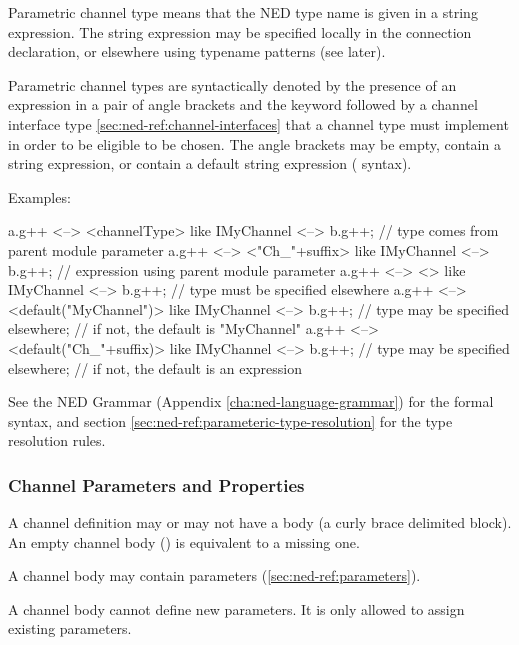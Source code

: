 Parametric channel type means that the NED type name is given in a string
expression. The string expression may be specified locally in the connection
declaration, or elsewhere using typename patterns (see later).

Parametric channel types are syntactically denoted by the presence of an
expression in a pair of angle brackets and the  keyword
followed by a channel interface type \ref{sec:ned-ref:channel-interfaces}
that a channel type must implement in order to be eligible to be chosen.
The angle brackets may be empty, contain a string expression, or contain a
default string expression ( syntax).

Examples:

\begin{ned}
a.g++ <--> <channelType> like IMyChannel <--> b.g++;
                                  // type comes from parent module parameter
a.g++ <--> <"Ch_"+suffix> like IMyChannel <--> b.g++;
                                  // expression using parent module parameter
a.g++ <--> <> like IMyChannel <--> b.g++;
                                  // type must be specified elsewhere
a.g++ <--> <default("MyChannel")> like IMyChannel <--> b.g++;
                                  // type may be specified elsewhere;
                                  // if not, the default is "MyChannel"
a.g++ <--> <default("Ch_"+suffix)> like IMyChannel <--> b.g++;
                                  // type may be specified elsewhere;
                                  // if not, the default is an expression
\end{ned}

See the NED Grammar (Appendix \ref{cha:ned-language-grammar}) for the
formal syntax, and section \ref{sec:ned-ref:parameteric-type-resolution}
for the type resolution rules.


\subsubsection{Channel Parameters and Properties}
\label{sec:ned-ref:channel-parameters-and-properties}

A channel definition may or may not have a body (a curly brace
delimited block). An empty channel body (\ttt{\{ \}}) is equivalent
to a missing one.

A channel body may contain parameters (\ref{sec:ned-ref:parameters}).

A channel body cannot define new parameters. It is only
allowed to assign existing parameters.

